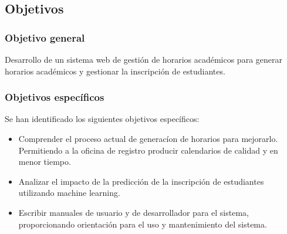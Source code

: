 \subsection{Objetivos}

\subsubsection{Objetivo general}
Desarrollo de un sistema web de gestión de horarios académicos para generar horarios académicos y gestionar la inscripción de estudiantes.

\subsubsection{Objetivos específicos}
Se han identificado los siguientes objetivos específicos:
\begin{itemize}
    \item Comprender el proceso actual de generacíon de horarios para mejorarlo.
    Permitiendo a la oficina de registro producir calendarios de calidad y en menor tiempo.
    \item Analizar el impacto de la predicción de la inscripción de estudiantes utilizando machine learning.
    \item Escribir manuales de usuario y de desarrollador para el sistema, proporcionando orientación para el uso y mantenimiento del sistema.
\end{itemize}

